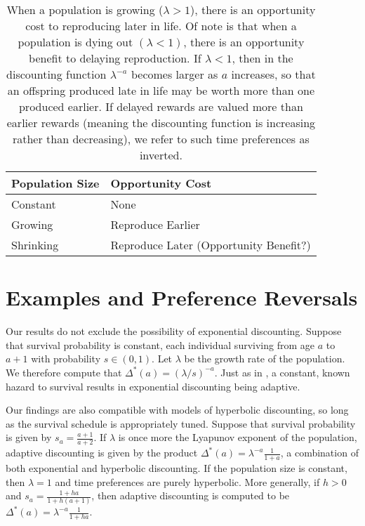 \documentclass[titlepage, hidelinks, 12pt]{article}
\theoremstyle{plain}
\theoremstyle{remark}
\theoremstyle{definition}
\begin{document}
\begin{table}[h]
    \centering
\begin{tabular}{|l|l|}
    \hline
Population Size & Opportunity Cost            \\ \hline \hline
Constant             & None                            \\
Growing         & Reproduce Earlier \\
Shrinking       & Reproduce Later (Opportunity Benefit?) \\ \hline
\end{tabular}
\caption{When a population is growing ($\lambda > 1$), there is an opportunity cost to reproducing later in life. Of note is that 
when a population is dying out $(\lambda < 1)$, there is an opportunity benefit to delaying reproduction. If $\lambda < 1$, then in 
the discounting function
$\lambda^{-a}$ becomes larger as $a$ increases, so that an offspring produced late in life may be worth more than one produced earlier. If delayed
rewards are valued more than earlier rewards (meaning the discounting function is increasing rather than decreasing), we 
refer to such time preferences as inverted.}
\end{table}

\section{Examples and Preference Reversals}
Our results do not exclude the possibility of exponential discounting. Suppose that survival probability is constant, each individual
surviving from age $a$ to $a+1$ with probability $s\in(0, 1)$. Let $\lambda$ be the growth rate of the population. We therefore compute
that $\Delta^*(a) = (\lambda/s)^{-a}$. Just as in \cite{sozou98}, a constant, known hazard to survival results in exponential discounting
being adaptive. 

Our findings are also compatible with models of hyperbolic discounting, so long as the survival schedule is appropriately tuned. Suppose
that survival probability is given by $s_a = \frac{a+1}{a+2}$. If $\lambda$ is once more the Lyapunov exponent of the population, adaptive
discounting is given by the product $\Delta^*(a) = \lambda^{-a}\frac{1}{1+a}$, a combination of both exponential and hyperbolic discounting. 
If the population size is constant, then $\lambda = 1$ and time preferences are purely hyperbolic. More generally, if 
$h>0$ and $s_a = \frac{1+ha}{1 + h(a+1)}$, then adaptive discounting
is computed to be $\Delta^*(a) = \lambda^{-a}\frac{1}{1+ha}$. 
\end{document}
